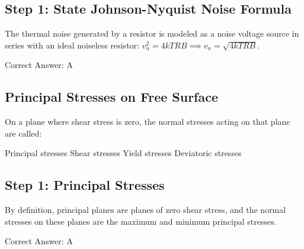 \begin{solution}

\subsection*{Step 1: State Johnson-Nyquist Noise Formula}
The thermal noise generated by a resistor is modeled as a noise voltage source in series with an ideal noiseless resistor: $v_{n}^2 = 4 k T R B \implies v_n = \sqrt{4 k T R B}$.

Correct Answer: A
\end{solution}

\clearpage

\subsection{Principal Stresses on Free Surface}

On a plane where shear stress is zero, the normal stresses acting on that plane are called:

\begin{choices}
    \correctchoice Principal stresses
    \choice Shear stresses
    \choice Yield stresses
    \choice Deviatoric stresses
\end{choices}

\begin{solution}

\subsection*{Step 1: Principal Stresses}
By definition, principal planes are planes of zero shear stress, and the normal stresses on these planes are the maximum and minimum principal stresses.

Correct Answer: A
\end{solution}

\clearpage

